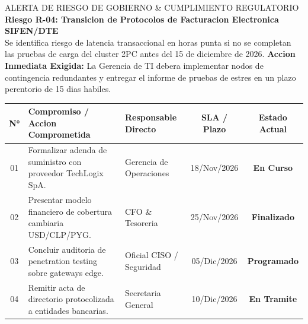 \documentclass[11pt,a4paper]{article}
\begin{document}
\vspace{1mm}

\begin{corpalert}{ALERTA DE RIESGO DE GOBIERNO \& CUMPLIMIENTO REGULATORIO}
  \textbf{Riesgo R-04: Transicion de Protocolos de Facturacion Electronica SIFEN/DTE}\\
  Se identifica riesgo de latencia transaccional en horas punta si no se completan las pruebas de carga del cluster 2PC antes del 15 de diciembre de 2026.
  \textbf{Accion Inmediata Exigida:} La Gerencia de TI debera implementar nodos de contingencia redundantes y entregar el informe de pruebas de estres en un plazo perentorio de 15 dias habiles.
\end{corpalert}

\vspace{2mm}

\vspace{1mm}

\noindent
\begin{tabularx}{\linewidth}{@{} c X p{3.8cm} c c @{}}
  \toprule
  \rowcolor{corpPrimary}
  {\bfseries\color{white}\scriptsize N°} &
  {\bfseries\color{white}\scriptsize Compromiso / Accion Comprometida} &
  {\bfseries\color{white}\scriptsize Responsable Directo} &
  {\bfseries\color{white}\scriptsize SLA / Plazo} &
  {\bfseries\color{white}\scriptsize Estado Actual} \\
  \midrule
  \rowcolor{corpLightBg}
  01 & Formalizar adenda de suministro con proveedor TechLogix SpA. & Gerencia de Operaciones & 18/Nov/2026 & \textcolor{corpWarning}{\textbf{En Curso}} \\
  02 & Presentar modelo financiero de cobertura cambiaria USD/CLP/PYG. & CFO \& Tesoreria & 25/Nov/2026 & \textcolor{corpSuccess}{\textbf{Finalizado}} \\
  \rowcolor{corpLightBg}
  03 & Concluir auditoria de penetration testing sobre gateways edge. & Oficial CISO / Seguridad & 05/Dic/2026 & \textcolor{corpPrimary}{\textbf{Programado}} \\
  04 & Remitir acta de directorio protocolizada a entidades bancarias. & Secretaria General & 10/Dic/2026 & \textcolor{corpWarning}{\textbf{En Tramite}} \\
  \bottomrule
\end{tabularx}

\vspace{3mm}
\end{document}
